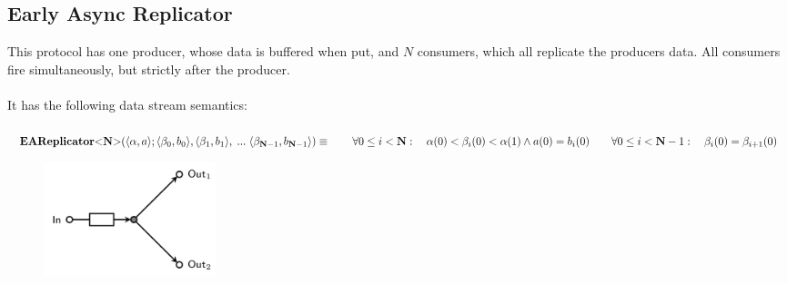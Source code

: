 \subsection{Early Async Replicator}
  This protocol has one producer, whose data is buffered when put, and $N$ consumers, which all replicate the producers data.
  All consumers fire simultaneously, but strictly after the producer.\\\\
  It has the following data stream semantics:\\\\
  $
  \vspace{0.2cm}\earep (\langle \alpha, a \rangle ; \langle \beta_0, b_0 \rangle, \langle \beta_1, b_1 \rangle,\; ... \; \langle \beta_{\textbf{N}-1}, b_{\textbf{N}-1} \rangle) \equiv \\
  \vspace{0.2cm} \hphantom \qquad \forall 0 \leq i < \textbf{N} : \quad \alpha(0) < \beta_i(0) < \alpha(1) \land a(0) = b_i(0) \\
  \hphantom \qquad\forall 0 \leq i < \textbf{N}-1 :\quad \beta_i(0) = \beta_{i+1}(0)
  $ \\
  \begin{figure}[H]
      \begin{center}
  \includegraphics[width=5cm]{img/EARep.png}
\end{center}
 \end{figure}
